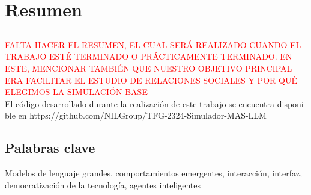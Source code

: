 \chapter*{Resumen}

\section*{\tituloPortadaVal}

\textcolor{red}{FALTA HACER EL RESUMEN, EL CUAL SERÁ REALIZADO CUANDO EL TRABAJO ESTÉ TERMINADO O PRÁCTICAMENTE TERMINADO. EN ESTE, MENCIONAR TAMBIÉN QUE NUESTRO OBJETIVO PRINCIPAL ERA FACILITAR EL ESTUDIO DE RELACIONES SOCIALES Y POR QUÉ ELEGIMOS LA SIMULACIÓN BASE}\\[0.1em]

El código desarrollado durante la realización de este trabajo se encuentra disponi- ble en https://github.com/NILGroup/TFG-2324-Simulador-MAS-LLM


\section*{Palabras clave}
   
\noindent Modelos de lenguaje grandes, comportamientos emergentes, interacción, interfaz, democratización de la tecnología, agentes inteligentes

   


